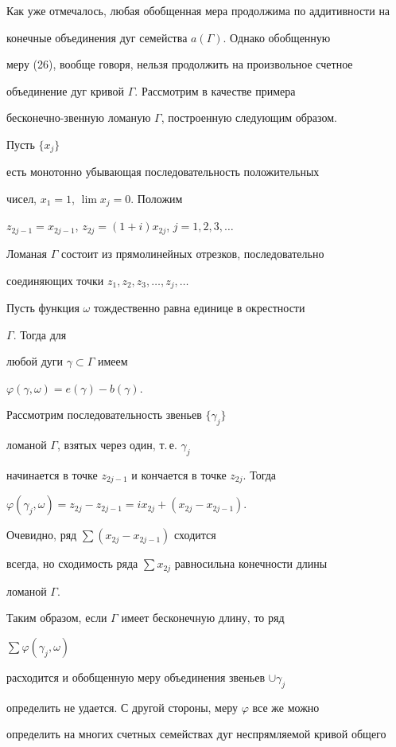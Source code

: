 Как уже отмечалось, любая обобщенная мера продолжима по аддитивности на 


конечные объединения дуг семейства $a(\Gamma)$. Однако обобщенную 


меру (26), вообще говоря, нельзя продолжить на произвольное счетное 


объединение дуг кривой $\Gamma$. Рассмотрим в качестве примера  


бесконечно-звенную ломаную $\Gamma$, построенную следующим образом. 


Пусть $\{x_j\}$ 


есть монотонно убывающая последовательность положительных 


чисел, $x_1=1$, $\lim x_j=0$. Положим 


$z_{2j-1}=x_{2j-1}$, $z_{2j}=(1+i)x_{2j}$, $j=1,2,3,\dotsc$ 


Ломаная $\Gamma$ состоит из прямолинейных отрезков, последовательно 


соединяющих точки $z_1,z_2,z_3,\dotsc,z_j,\dotsc$ 


Пусть функция $\omega$ тождественно равна единице в окрестности 


$\Gamma$. Тогда для 


любой дуги $\gamma\subset\Gamma$ имеем 


$\varphi(\gamma,\omega)=e(\gamma)-b(\gamma)$. 


Рассмотрим последовательность звеньев $\{\gamma_j\}$ 


ломаной $\Gamma$, взятых через один, т.\,е.{} $\gamma_j$ 


начинается в точке $z_{2j-1}$ и кончается в точке $z_{2j}$. Тогда 


$\varphi(\gamma_j,\omega)=z_{2j}-z_{2j-1}=ix_{2j}+(x_{2j}-x_{2j-1})$. 


Очевидно, ряд $\sum(x_{2j}-x_{2j-1})$ сходится 


всегда, но сходимость ряда $\sum x_{2j}$ равносильна конечности длины 


ломаной $\Gamma$. 


Таким образом, если $\Gamma$ имеет бесконечную длину, то ряд 


$\sum\varphi(\gamma_j,\omega)$ 


расходится и обобщенную меру объединения звеньев $\cup\gamma_j$ 


определить не удается. С другой стороны, меру $\varphi$ все же можно 


определить на многих счетных семействах дуг неспрямляемой кривой общего 


